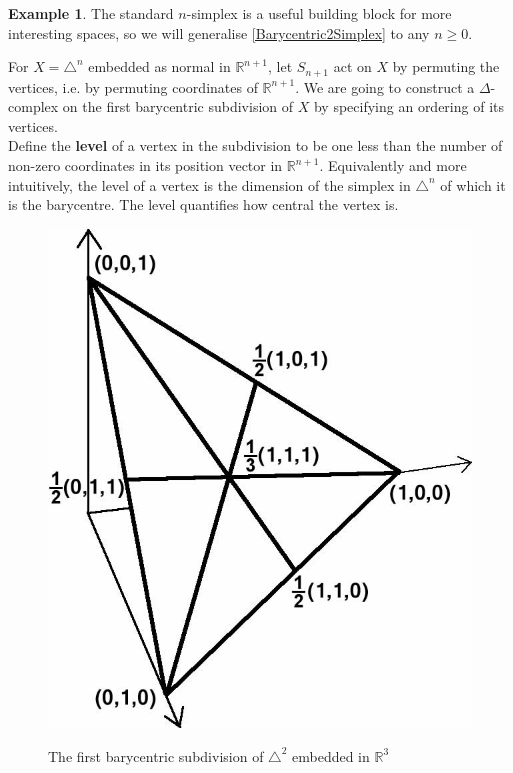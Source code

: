 \documentclass[11pt,a4paper,twoside]{article}
\theoremstyle{plain}
\theoremstyle{definition}
\theoremstyle{definition}
\theoremstyle{definition}
\theoremstyle{definition}
\newtheorem{example}[thm]{Example}
\theoremstyle{definition}
\begin{document}
\begin{example}
\label{BarycentricNSimplex}
The standard $n$-simplex is a useful building block for more interesting spaces, so we will generalise \ref{Barycentric2Simplex} to any $n\geq0$.

For $X=\triangle^n$ embedded as normal in $\mathbb{R}^{n+1}$, let $S_{n+1}$ act on $X$ by permuting the vertices, i.e. by permuting coordinates of $\mathbb{R}^{n+1}$. We are going to construct a $\Delta$-complex on the first barycentric subdivision of $X$ by specifying an ordering of its vertices.\\
Define the \textbf{level} of a vertex in the subdivision to be one less than the number of non-zero coordinates in its position vector in $\mathbb{R}^{n+1}$. Equivalently and more intuitively, the level of a vertex is the dimension of the simplex in $\triangle^n$ of which it is the barycentre. The level quantifies how central the vertex is.
\begin{figure}
    \centering
    \includegraphics[scale=0.24]{Images/2SimplexInR3.jpg}
    \label{Fig:Triangle2inR3}
    \caption{The first barycentric subdivision of $\triangle^2$ embedded in $\mathbb{R}^3$}

\end{figure}
\end{example}
\end{document}
